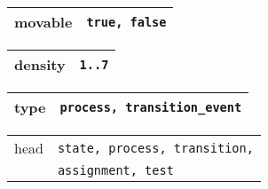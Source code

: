 \documentclass[10pt, a4paper]{article}
\begin{document}
\begin{table}[H]
\def\baselinestretch{1}
{\small
\begin{tabular}{|l|l|}
\hline
{\sc movable} & {\tt true, false} \\
\hline
\end{tabular}
} 
\def\baselinestretch{1.9}
\end{table}

\begin{table}[H]
\def\baselinestretch{1}
{\small
\begin{tabular}{|l|l|}
\hline
{\sc density} & {\tt 1..7} \\
\hline
\end{tabular}
} 
\def\baselinestretch{1.9}
\end{table}


\begin{table}[H]
\def\baselinestretch{1}
{\small
\begin{tabular}{|l|l|}
\hline
{\sc type} & {\tt process, transition\_event} \\
\hline
\end{tabular}
} 
\def\baselinestretch{1.9}
\end{table}

\begin{table}[H]
\def\baselinestretch{1}
{\small
\begin{tabular}{|l|l|}
\hline
{\sc head} & {\tt state, process, transition,} \\
& {\tt assignment, test} \\
\hline
\end{tabular}
} 
\def\baselinestretch{1.9}
\end{table}

\end{document}
